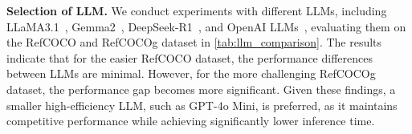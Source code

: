\begin{table}[t]
\centering
{}
\vspace{-2.5mm}
\caption{\textbf{Contribution of components of \methodname{}.} Results (accuracy) are based on the RefCOCO test A, RefCOCO+ test A, RefCOCOg test and Ref-Adv test set.}
\label{tab:ablation}
\vspace{-4.5mm}
\end{table}

\noindent\textbf{Selection of LLM.} We conduct experiments with different LLMs, including LLaMA3.1~\cite{dubeyLlama2024}, Gemma2~\cite{team_gemma_2024}, DeepSeek-R1~\cite{deepseek-ai_deepseek-r1_2025-1}, and OpenAI LLMs~\cite{openai_gpt-4o_2024}, evaluating them on the RefCOCO and RefCOCOg dataset in \autoref{tab:llm_comparison}. The results indicate that for the easier RefCOCO dataset, the performance differences between LLMs are minimal. However, for the more challenging RefCOCOg dataset, the performance gap becomes more significant. Given these findings, a smaller high-efficiency LLM, such as GPT-4o Mini, is preferred, as it maintains competitive performance while achieving significantly lower inference time.

